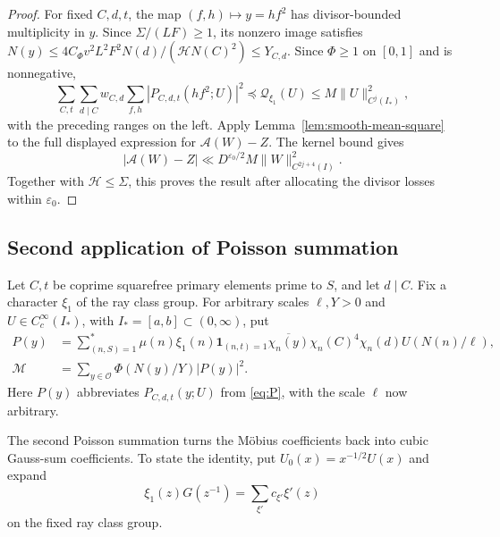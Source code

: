 \documentclass[11pt,a4paper]{article}
\numberwithin{equation}{section}
\numberwithin{figure}{section}
\theoremstyle{definition}
\theoremstyle{remark}
\newcommand{\OO}{\mathcal O}
\newcommand{\ind}{\mathbf1}
\newcommand{\precbd}{\preccurlyeq}
\begin{document}
\begin{proof}
For fixed $C,d,t$, the map $(f,h)\mapsto y=hf^2$ has
divisor-bounded multiplicity in $y$. Since $\Sigma/(LF)\ge1$, its
nonzero image satisfies
$N(y)\le4C_\Phi v^2L^2F^2N(d)/(\mathcal H N(C)^2)\le Y_{C,d}$.
Since $\Phi\ge1$ on $[0,1]$ and is nonnegative,
\[
 \sum_{C,t}\sum_{d\mid C}w_{C,d}\sum_{f,h}|P_{C,d,t}(hf^2;U)|^2
 \precbd\mathcal Q_{\xi_1}(U)
 \le M\|U\|_{C^j(I_*)}^2,
\]
with the preceding ranges on the left. Apply
Lemma~\ref{lem:smooth-mean-square} to the full displayed expression
for $\mathcal A(W)-Z$. The kernel bound gives
\[
 |\mathcal A(W)-Z|
 \ll D^{\varepsilon_0/2}M\|W\|_{C^{2j+4}(I)}^2.
\]
Together with $\mathcal H\le\Sigma$, this proves the result after
allocating the divisor losses within $\varepsilon_0$.
\end{proof}

\subsection{Second application of Poisson summation}

Let $C,t$ be coprime squarefree primary elements prime to $S$, and let
$d\mid C$. Fix a character $\xi_1$ of the ray class group.
For arbitrary scales $\ell,Y>0$ and
$U\in C_c^\infty(I_*)$, with
$I_*=[a,b]\subset(0,\infty)$, put
\begin{equation}\label{eq:common-mobius-sum}
 \begin{aligned}
 P(y)&=\sum_{(n,S)=1}^*\mu(n)\xi_1(n)\ind_{(n,t)=1}
 \overline{\chi_n(y)}\chi_n(C)^4\chi_n(d)U(N(n)/\ell),\\
 \mathcal M&=\sum_{y\in\OO}\Phi(N(y)/Y)|P(y)|^2.
 \end{aligned}
\end{equation}
Here $P(y)$ abbreviates $P_{C,d,t}(y;U)$ from \eqref{eq:P}, with the scale $\ell$ now arbitrary.

The second Poisson summation turns the M\"obius coefficients back into
cubic Gauss-sum coefficients. To state the identity, put
$U_0(x)=x^{-1/2}U(x)$ and expand
\[
 \xi_1(z)G(z^{-1})=\sum_{\xi'}c_{\xi'}\xi'(z)
\]
on the fixed ray class group.
\end{document}
